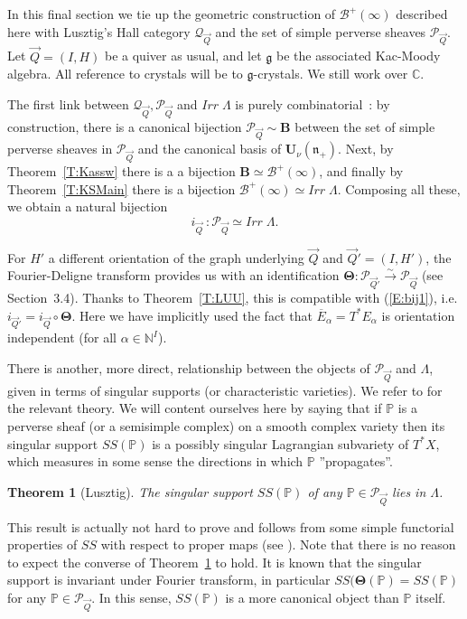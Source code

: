 \documentclass[a4paper,10pt]{amsart}
\def\U{\mathbf{U}}
\def\N{\mathbb{N}}
\def\a{\alpha}
\def\C{\mathbb{C}}
\def\n{\mathfrak{n}}
\def\QQ{\mathcal{Q}_{\vec{Q}}}
\def\PQ{\mathcal{P}_{\vec{Q}}}
\newtheorem{theo}{\bf{Theorem}}[section]
\numberwithin{equation}{section}
\begin{document}
\vspace{.15in}

In this final section we tie up the geometric construction of $\mathcal{B}^+(\infty)$ described here with Lusztig's Hall category $\QQ$ and the set of simple perverse sheaves $\PQ$.  Let $\vec{Q}=(I,H)$ be a quiver as usual, and let $\mathfrak{g}$ be the associated Kac-Moody algebra. All reference to crystals will be to $\mathfrak{g}$-crystals. We still work over $\C$.

\vspace{.1in}

The first link between $\QQ, \PQ$ and $Irr\;\Lambda$ is purely combinatorial~: by construction, there is a canonical bijection $\PQ \sim \mathbf{B}$ between the set of simple perverse sheaves in $\PQ$ and the canonical basis of $\U_{\nu}(\n_+)$. Next, by Theorem~\ref{T:Kassw} there is a a bijection $\mathbf{B} \simeq \mathcal{B}^+(\infty)$, and finally by Theorem~\ref{T:KSMain} there is a bijection
$\mathcal{B}^+(\infty) \simeq Irr\;\Lambda$. Composing all these, we obtain a natural bijection
\begin{equation}\label{E:bij1}
i_{\vec{Q}}~:\PQ \simeq Irr\;\Lambda.
\end{equation}

For $H'$ a different orientation of the graph underlying $\vec{Q}$ and $\vec{Q}'=(I,H')$, the Fourier-Deligne transform provides us with an identification $\boldsymbol{\Theta} :  \mathcal{P}_{\vec{Q}'} \stackrel{\sim}{\to} \PQ$ (see Section~3.4). Thanks to Theorem~\ref{T:LUU}, this is compatible with (\ref{E:bij1}), i.e. $i_{\vec{Q}'}=i_{\vec{Q}} \circ \boldsymbol{\Theta}$. Here we have implicitly used the fact that $\overline{E}_{\a}=T^*E_{\a}$ is orientation independent (for all $\a \in \N^I$).

\vspace{.1in}

There is another, more direct, relationship between the objects of $\PQ$ and $\Lambda$, given in terms of singular supports (or characteristic varieties). We refer to \cite{KasShap} for the relevant theory. We will content ourselves here by saying that if $\mathbb{P}$ is a perverse sheaf (or a semisimple complex) on a smooth complex variety then its singular support $SS(\mathbb{P})$ is a possibly singular Lagrangian subvariety of $T^*X$, which measures in some sense the directions in which $\mathbb{P}$ ''propagates''. 

\begin{theo}[Lusztig]\label{T:SSLU} The singular support $SS(\mathbb{P})$ of any $\mathbb{P} \in \PQ$ lies in $\Lambda$.
\end{theo}
This result is actually not hard to prove and follows from some simple functorial properties of $SS$ with respect to proper maps (see \cite{Lusaff}). Note that there is no reason to expect the converse of Theorem~\ref{T:SSLU} to hold. It is known that the singular support is invariant under Fourier transform, in particular $SS(\boldsymbol{\Theta}(\mathbb{P})=SS(\mathbb{P})$ for any $\mathbb{P} \in \PQ$. In this sense,  $SS(\mathbb{P})$
is a more canonical object than $\mathbb{P}$ itself.
\end{document}
